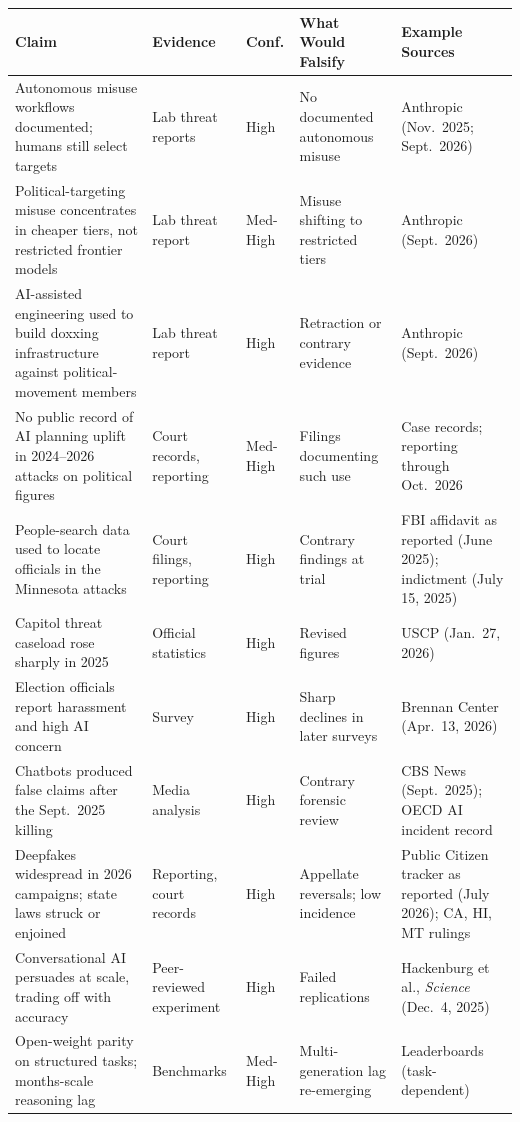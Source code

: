 \documentclass[11pt,letterpaper]{article}
\begin{document}
{\footnotesize
\begin{longtable}{L{4.2cm}L{1.9cm}L{1.2cm}L{3.2cm}L{3.6cm}}
\toprule
\textbf{Claim} & \textbf{Evidence} & \textbf{Conf.} & \textbf{What Would Falsify} & \textbf{Example Sources} \\
\midrule
\endhead
\bottomrule
\endlastfoot
Autonomous misuse workflows documented; humans still select targets & Lab threat reports & High & No documented autonomous misuse & Anthropic (Nov.\ 2025; Sept.\ 2026) \\
Political-targeting misuse concentrates in cheaper tiers, not restricted frontier models & Lab threat report & Med-High & Misuse shifting to restricted tiers & Anthropic (Sept.\ 2026) \\
AI-assisted engineering used to build doxxing infrastructure against political-movement members & Lab threat report & High & Retraction or contrary evidence & Anthropic (Sept.\ 2026) \\
No public record of AI planning uplift in 2024--2026 attacks on political figures & Court records, reporting & Med-High & Filings documenting such use & Case records; reporting through Oct.\ 2026 \\
People-search data used to locate officials in the Minnesota attacks & Court filings, reporting & High & Contrary findings at trial & FBI affidavit as reported (June 2025); indictment (July 15, 2025) \\
Capitol threat caseload rose sharply in 2025 & Official statistics & High & Revised figures & USCP (Jan.\ 27, 2026) \\
Election officials report harassment and high AI concern & Survey & High & Sharp declines in later surveys & Brennan Center (Apr.\ 13, 2026) \\
Chatbots produced false claims after the Sept.\ 2025 killing & Media analysis & High & Contrary forensic review & CBS News (Sept.\ 2025); OECD AI incident record \\
Deepfakes widespread in 2026 campaigns; state laws struck or enjoined & Reporting, court records & High & Appellate reversals; low incidence & Public Citizen tracker as reported (July 2026); CA, HI, MT rulings \\
Conversational AI persuades at scale, trading off with accuracy & Peer-reviewed experiment & High & Failed replications & Hackenburg et al., \textit{Science} (Dec.\ 4, 2025) \\
Open-weight parity on structured tasks; months-scale reasoning lag & Benchmarks & Med-High & Multi-generation lag re-emerging & Leaderboards (task-dependent) \\

\end{longtable}}
\end{document}

